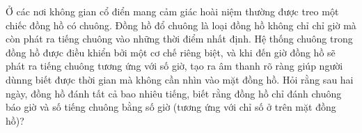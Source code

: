 \begin{ex}%
	Ở các nơi không gian cổ điển mang cảm giác hoài niệm thường được treo một chiếc đồng hồ có chuông. Đồng hồ đổ chuông là loại đồng hồ không chỉ chỉ giờ mà còn phát ra tiếng chuông vào những thời điểm nhất định. Hệ thống chuông trong đồng hồ được điều khiển bởi một cơ chế riêng biệt, và khi đến giờ đồng hồ sẽ phát ra tiếng chuông tương ứng với số giờ, tạo ra âm thanh rõ ràng giúp người dùnng biết được thời gian mà không cần nhìn vào mặt đồng hồ. Hỏi rằng sau hai ngày, đồng hồ đánh tất cả bao nhiêu tiếng, biết rằng đồng hồ chỉ đánh chuông báo giờ và số tiếng chuông bằng số giờ (tương ứng với chỉ số ở trên mặt đồng hồ)?
\end{ex}


